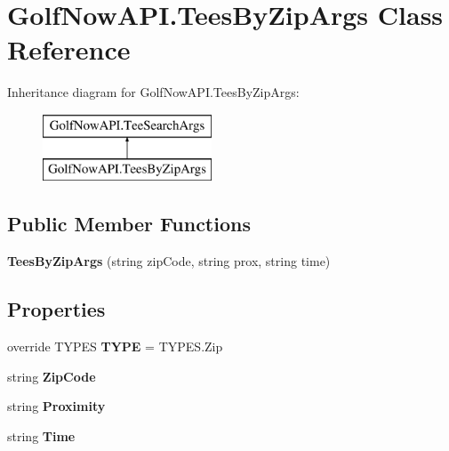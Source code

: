 \hypertarget{class_golf_now_a_p_i_1_1_tees_by_zip_args}{}\section{Golf\+Now\+A\+P\+I.\+Tees\+By\+Zip\+Args Class Reference}
\label{class_golf_now_a_p_i_1_1_tees_by_zip_args}
Inheritance diagram for Golf\+Now\+A\+P\+I.\+Tees\+By\+Zip\+Args\+:\begin{figure}[H]
\begin{center}
\leavevmode
\includegraphics[height=2.000000cm]{class_golf_now_a_p_i_1_1_tees_by_zip_args}
\end{center}
\end{figure}
\subsection*{Public Member Functions}
\begin{DoxyCompactItemize}
\item 
\mbox{\label{class_golf_now_a_p_i_1_1_tees_by_zip_args_aede345ced3c1549e6eb383f607f221c8}} 
{\bfseries Tees\+By\+Zip\+Args} (string zip\+Code, string prox, string time)
\end{DoxyCompactItemize}
\subsection*{Properties}
\begin{DoxyCompactItemize}
\item 
\mbox{\label{class_golf_now_a_p_i_1_1_tees_by_zip_args_a33ad2bd8841717e1c12cdb50df4a95c7}} 
override T\+Y\+P\+ES {\bfseries T\+Y\+PE} = T\+Y\+P\+E\+S.\+Zip
\item 
\mbox{\label{class_golf_now_a_p_i_1_1_tees_by_zip_args_aa6da8d2adb24ab90147e827d4c0bddf4}} 
string {\bfseries Zip\+Code}
\item 
\mbox{\label{class_golf_now_a_p_i_1_1_tees_by_zip_args_aa7866c5c3d7c4f5b22affbde42445d13}} 
string {\bfseries Proximity}
\item 
\mbox{\label{class_golf_now_a_p_i_1_1_tees_by_zip_args_a4d27e062d8c7629206bbe39eb76c9944}} 
string {\bfseries Time}
\end{DoxyCompactItemize}
